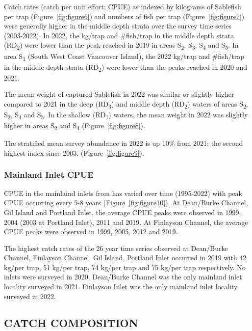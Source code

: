 \documentclass[12pt]{article}\usepackage[]{graphicx}\usepackage[]{color}
\begin{document}
Catch rates (catch per unit effort; CPUE) as indexed by kilograms of Sablefish per trap (Figure~\ref{fig:figure6}) and numbers of fish per trap (Figure~\ref{fig:figure7}) were generally higher in the middle depth strata over the survey time series (2003-2022). In 2022, the kg/trap and \#fish/trap in the middle depth strata (RD\textsubscript{2}) were lower than the peak reached in 2019 in areas S\textsubscript{2}, S\textsubscript{3}, S\textsubscript{4} and S\textsubscript{5}. In area S\textsubscript{1} (South West Coast Vancouver Island), the 2022 kg/trap and \#fish/trap in the middle depth strata (RD\textsubscript{2}) were lower than the peaks reached in 2020 and 2021.

The mean weight of captured Sablefish in 2022 was similar or slightly higher compared to 2021 in the deep (RD\textsubscript{3}) and middle depth (RD\textsubscript{2}) waters of areas S\textsubscript{2}, S\textsubscript{3}, S\textsubscript{4} and S\textsubscript{5}. In the shallow (RD\textsubscript{1}) waters, the mean weight in 2022 was slightly higher in areas S\textsubscript{2} and S\textsubscript{4} (Figure~\ref{fig:figure8}).

The stratified mean survey abundance in 2022 is up 10\% from 2021; the second highest index since 2003. (Figure~\ref{fig:figure9}).

\hypertarget{mainland-inlet-cpue}{%
\subsubsection{Mainland Inlet CPUE}\label{mainland-inlet-cpue}}

CPUE in the mainlaind inlets from has varied over time (1995-2022) with peak CPUE occurring every 5-8 years (Figure~\ref{fig:figure10}). At Dean/Burke Channel, Gil Island and Portland Inlet, the average CPUE peaks were observed in 1999, 2004 (2003 at Portland Inlet), 2011 and 2019. At Finlayson Channel, the average CPUE peaks were observed in 1999, 2005, 2012 and 2019.

The highest catch rates of the 26 year time series observed at Dean/Burke Channel, Finlayson Channel, Gil Island, Portland Inlet occurred in 2019 with 42 kg/per trap, 51 kg/per trap, 74 kg/per trap and 75 kg/per trap respectively. No inlets were surveyed in 2020. Dean/Burke Channel was the only mainland inlet locality surveyed in 2021. Finlayson Inlet was the only mainland inlet locality surveyed in 2022.

\hypertarget{catch-composition}{%
\subsection{CATCH COMPOSITION}\label{catch-composition}}
\end{document}
